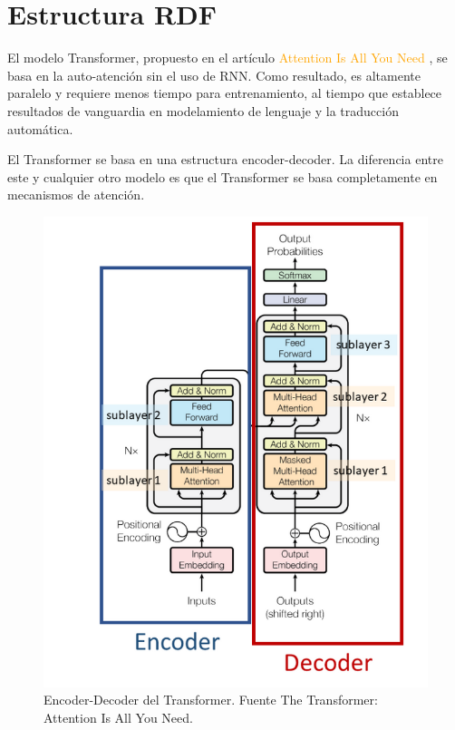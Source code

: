 \documentclass[conference]{IEEEtran}
\begin{document}
\section{Estructura RDF}

El modelo Transformer, propuesto en el art\'iculo \textcolor{orange}{Attention Is All You Need} \cite{b1}, se basa en la auto-atenci\'on sin el uso de RNN. Como resultado, es altamente paralelo y requiere menos tiempo para entrenamiento, al tiempo que establece resultados de vanguardia en modelamiento de lenguaje y la traducci\'on autom\'atica.

\vspace{0.2cm}

El Transformer se basa en una estructura encoder-decoder. La diferencia entre este y cualquier otro modelo es que el Transformer se basa completamente en mecanismos de atenci\'on. 

\begin{figure}[h]
\includegraphics[scale=0.3]{imagenes/Encoder-decoder.png} 
\caption{Encoder-Decoder del Transformer. Fuente The Transformer:
Attention Is All You Need. \cite{b1}}
\end{figure}
\end{document}
